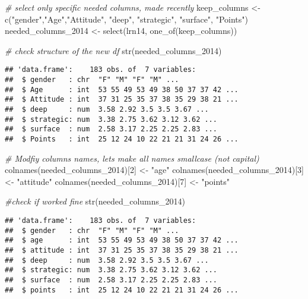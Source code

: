\documentclass[
]{article}
\newenvironment{Shaded}{\begin{snugshade}}{\end{snugshade}}
\newcommand{\CommentTok}[1]{\textcolor[rgb]{0.56,0.35,0.01}{\textit{#1}}}
\newcommand{\DecValTok}[1]{\textcolor[rgb]{0.00,0.00,0.81}{#1}}
\newcommand{\FunctionTok}[1]{\textcolor[rgb]{0.00,0.00,0.00}{#1}}
\newcommand{\NormalTok}[1]{#1}
\newcommand{\OtherTok}[1]{\textcolor[rgb]{0.56,0.35,0.01}{#1}}
\newcommand{\StringTok}[1]{\textcolor[rgb]{0.31,0.60,0.02}{#1}}
\begin{document}
\begin{Shaded}
\begin{Highlighting}[]
\CommentTok{\# select only specific needed columns, made recently}
\NormalTok{keep\_columns }\OtherTok{\textless{}{-}} \FunctionTok{c}\NormalTok{(}\StringTok{"gender"}\NormalTok{,}\StringTok{"Age"}\NormalTok{,}\StringTok{"Attitude"}\NormalTok{, }\StringTok{"deep"}\NormalTok{, }\StringTok{"strategic"}\NormalTok{, }\StringTok{"surface"}\NormalTok{, }\StringTok{"Points"}\NormalTok{)}
\NormalTok{needed\_columns\_2014 }\OtherTok{\textless{}{-}} \FunctionTok{select}\NormalTok{(lrn14, }\FunctionTok{one\_of}\NormalTok{(keep\_columns))}
\end{Highlighting}
\end{Shaded}

\begin{Shaded}
\begin{Highlighting}[]
\CommentTok{\# check structure of the new df}
\FunctionTok{str}\NormalTok{(needed\_columns\_2014)}
\end{Highlighting}
\end{Shaded}

\begin{verbatim}
## 'data.frame':    183 obs. of  7 variables:
##  $ gender   : chr  "F" "M" "F" "M" ...
##  $ Age      : int  53 55 49 53 49 38 50 37 37 42 ...
##  $ Attitude : int  37 31 25 35 37 38 35 29 38 21 ...
##  $ deep     : num  3.58 2.92 3.5 3.5 3.67 ...
##  $ strategic: num  3.38 2.75 3.62 3.12 3.62 ...
##  $ surface  : num  2.58 3.17 2.25 2.25 2.83 ...
##  $ Points   : int  25 12 24 10 22 21 21 31 24 26 ...
\end{verbatim}

\begin{Shaded}
\begin{Highlighting}[]
\CommentTok{\# Modfiy columns names, let\textquotesingle{}s make all names smallcase (not capital)}
\FunctionTok{colnames}\NormalTok{(needed\_columns\_2014)[}\DecValTok{2}\NormalTok{] }\OtherTok{\textless{}{-}} \StringTok{"age"}
\FunctionTok{colnames}\NormalTok{(needed\_columns\_2014)[}\DecValTok{3}\NormalTok{] }\OtherTok{\textless{}{-}} \StringTok{"attitude"}
\FunctionTok{colnames}\NormalTok{(needed\_columns\_2014)[}\DecValTok{7}\NormalTok{] }\OtherTok{\textless{}{-}} \StringTok{"points"}

\CommentTok{\#check if worked fine}
\FunctionTok{str}\NormalTok{(needed\_columns\_2014)}
\end{Highlighting}
\end{Shaded}

\begin{verbatim}
## 'data.frame':    183 obs. of  7 variables:
##  $ gender   : chr  "F" "M" "F" "M" ...
##  $ age      : int  53 55 49 53 49 38 50 37 37 42 ...
##  $ attitude : int  37 31 25 35 37 38 35 29 38 21 ...
##  $ deep     : num  3.58 2.92 3.5 3.5 3.67 ...
##  $ strategic: num  3.38 2.75 3.62 3.12 3.62 ...
##  $ surface  : num  2.58 3.17 2.25 2.25 2.83 ...
##  $ points   : int  25 12 24 10 22 21 21 31 24 26 ...
\end{verbatim}
\end{document}

